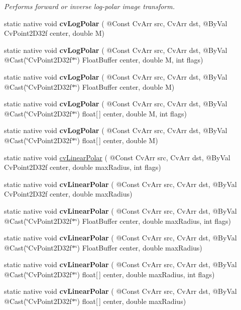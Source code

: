 \begin{DoxyCompactItemize}
\begin{DoxyCompactList}\small\item\em Performs forward or inverse log-\/polar image transform. \end{DoxyCompactList}\item 
static native void {\bfseries cv\+Log\+Polar} ( @Const Cv\+Arr src, Cv\+Arr dst, @By\+Val Cv\+Point2\+D32f center, double M)
\item 
static native void {\bfseries cv\+Log\+Polar} ( @Const Cv\+Arr src, Cv\+Arr dst, @By\+Val @Cast(\char`\"{}Cv\+Point2\+D32f$\ast$\char`\"{}) Float\+Buffer center, double M, int flags)
\item 
static native void {\bfseries cv\+Log\+Polar} ( @Const Cv\+Arr src, Cv\+Arr dst, @By\+Val @Cast(\char`\"{}Cv\+Point2\+D32f$\ast$\char`\"{}) Float\+Buffer center, double M)
\item 
static native void {\bfseries cv\+Log\+Polar} ( @Const Cv\+Arr src, Cv\+Arr dst, @By\+Val @Cast(\char`\"{}Cv\+Point2\+D32f$\ast$\char`\"{}) float\mbox{[}$\,$\mbox{]} center, double M, int flags)
\item 
static native void {\bfseries cv\+Log\+Polar} ( @Const Cv\+Arr src, Cv\+Arr dst, @By\+Val @Cast(\char`\"{}Cv\+Point2\+D32f$\ast$\char`\"{}) float\mbox{[}$\,$\mbox{]} center, double M)
\item 
static native void \hyperlink{group__imgproc__c_gaea7618f99d98e843a4bd01f403a4995e}{cv\+Linear\+Polar} ( @Const Cv\+Arr src, Cv\+Arr dst, @By\+Val Cv\+Point2\+D32f center, double max\+Radius, int flags)
\item 
static native void {\bfseries cv\+Linear\+Polar} ( @Const Cv\+Arr src, Cv\+Arr dst, @By\+Val Cv\+Point2\+D32f center, double max\+Radius)
\item 
static native void {\bfseries cv\+Linear\+Polar} ( @Const Cv\+Arr src, Cv\+Arr dst, @By\+Val @Cast(\char`\"{}Cv\+Point2\+D32f$\ast$\char`\"{}) Float\+Buffer center, double max\+Radius, int flags)
\item 
static native void {\bfseries cv\+Linear\+Polar} ( @Const Cv\+Arr src, Cv\+Arr dst, @By\+Val @Cast(\char`\"{}Cv\+Point2\+D32f$\ast$\char`\"{}) Float\+Buffer center, double max\+Radius)
\item 
static native void {\bfseries cv\+Linear\+Polar} ( @Const Cv\+Arr src, Cv\+Arr dst, @By\+Val @Cast(\char`\"{}Cv\+Point2\+D32f$\ast$\char`\"{}) float\mbox{[}$\,$\mbox{]} center, double max\+Radius, int flags)
\item 
static native void {\bfseries cv\+Linear\+Polar} ( @Const Cv\+Arr src, Cv\+Arr dst, @By\+Val @Cast(\char`\"{}Cv\+Point2\+D32f$\ast$\char`\"{}) float\mbox{[}$\,$\mbox{]} center, double max\+Radius)

\end{DoxyCompactItemize}
